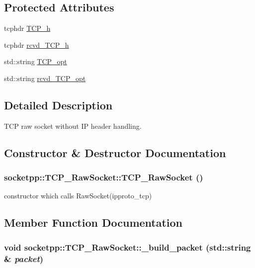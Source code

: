 \subsection*{Protected Attributes}
\begin{CompactItemize}
\item 
tcphdr \hyperlink{classsocketpp_1_1TCP__RawSocket_d1980411bd147dd67f6d9d9578414c17}{TCP\_\-h}
\item 
tcphdr \hyperlink{classsocketpp_1_1TCP__RawSocket_12b2d2f00d02c377301fc10e1209a8b8}{rcvd\_\-TCP\_\-h}
\item 
std::string \hyperlink{classsocketpp_1_1TCP__RawSocket_380529364d9488faf998543d433d8fe6}{TCP\_\-opt}
\item 
std::string \hyperlink{classsocketpp_1_1TCP__RawSocket_b7bddcb31a7a310bcf61fcc474ded465}{rcvd\_\-TCP\_\-opt}
\end{CompactItemize}


\subsection{Detailed Description}
TCP raw socket without IP header handling. 

\subsection{Constructor \& Destructor Documentation}
\hypertarget{classsocketpp_1_1TCP__RawSocket_f0b76c8fdc293bb5e22914b247b1e7b8}{
\subsubsection[{TCP\_\-RawSocket}]{\setlength{\rightskip}{0pt plus 5cm}socketpp::TCP\_\-RawSocket::TCP\_\-RawSocket ()}}
\label{classsocketpp_1_1TCP__RawSocket_f0b76c8fdc293bb5e22914b247b1e7b8}


constructor which calls RawSocket(ipproto\_\-tcp) 



\subsection{Member Function Documentation}
\hypertarget{classsocketpp_1_1TCP__RawSocket_d89a39d4bc91a76d0cb50da5cdd10fbc}{
\subsubsection[{\_\-build\_\-packet}]{\setlength{\rightskip}{0pt plus 5cm}void socketpp::TCP\_\-RawSocket::\_\-build\_\-packet (std::string \& {\em packet})}}
\label{classsocketpp_1_1TCP__RawSocket_d89a39d4bc91a76d0cb50da5cdd10fbc}




